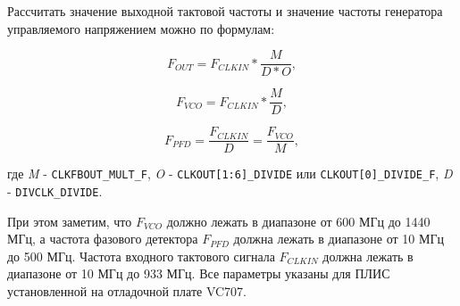 \documentclass[a4paper,oneside ,10pt]{extreport}
\begin{document}
Рассчитать значение выходной тактовой частоты и значение частоты генератора управляемого напряжением можно по формулам:

\begin{equation}	
	F_{OUT} =  F_{CLKIN} * \frac{M}{D*O},
\end{equation}

\begin{equation}	
	F_{VCO} =  F_{CLKIN} * \frac{M}{D},
\end{equation}

\begin{equation}	
	F_{PFD} =  \frac{F_{CLKIN}}{D} = \frac{F_{VCO}}{M},
\end{equation}

где \textit{M} - \verb|CLKFBOUT_MULT_F|, \textit{O} - \verb|CLKOUT[1:6]_DIVIDE| или \verb|CLKOUT[0]_DIVIDE_F|, \textit{D} - \verb|DIVCLK_DIVIDE|. 	 

При этом заметим, что \(F_{VCO}\) должно лежать в диапазоне от 600 МГц до 1440 МГц, а частота фазового детектора \(F_{PFD}\) должна лежать в диапазоне от 10 МГц до 500 МГц. Частота входного
тактового сигнала \(F_{CLKIN}\) должна лежать в диапазоне от 10 МГц до 933 МГц. Все параметры указаны для ПЛИС установленной на отладочной плате VC707.  
\end{document}
